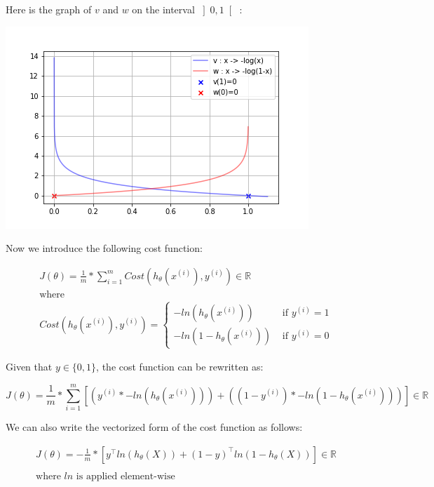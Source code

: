 \documentclass[a4paper, 12pt]{article}
\begin{document}
Here is the graph of $v$ and $w$ on the interval $\left] 0, 1 \right[$ :

\begin{center}
  \includegraphics[scale=0.7]{vw}
  \label{fig:vw}
\end{center}

Now we introduce the following cost function:

\begin{align*}
& J(\theta) = \frac{1}{m} * \sum_{i=1}^{m} Cost\left(h_{\theta}\left(x^{(i)}\right), y^{(i)}\right) \in \mathbb{R} \\
& \text{where} \\
& Cost\left(h_{\theta}\left(x^{(i)}\right), y^{(i)}\right)  =
\begin{cases}
-ln\left(h_{\theta}\left(x^{(i)}\right)\right) & \text{ if } y^{(i)}=1 \\
-ln\left(1-h_{\theta}\left(x^{(i)}\right)\right) & \text{ if } y^{(i)}=0
\end{cases}
\end{align*}

Given that $y \in \{0, 1\}$, the cost function can be rewritten as:

\begin{equation}
J(\theta) = \frac{1}{m} * \sum_{i=1}^{m} \left[  \left(y^{(i)} * -ln\left(h_{\theta}\left(x^{(i)}\right)\right)\right) + \left( (1-y^{(i)}) * -ln\left(1-h_{\theta}\left(x^{(i)}\right)\right)  \right) \right] \in \mathbb{R}
\end{equation}

We can also write the vectorized form of the cost function as follows:

\begin{align*}
& J(\theta) = -\frac{1}{m} * \left[y^{\top} ln(h_{\theta}(X)) + (1-y)^{\top}ln(1-h_{\theta}(X)) \right] \in \mathbb{R} \\
& \\
& \text{where } ln \text{ is applied element-wise} 
\end{align*}
\end{document}

